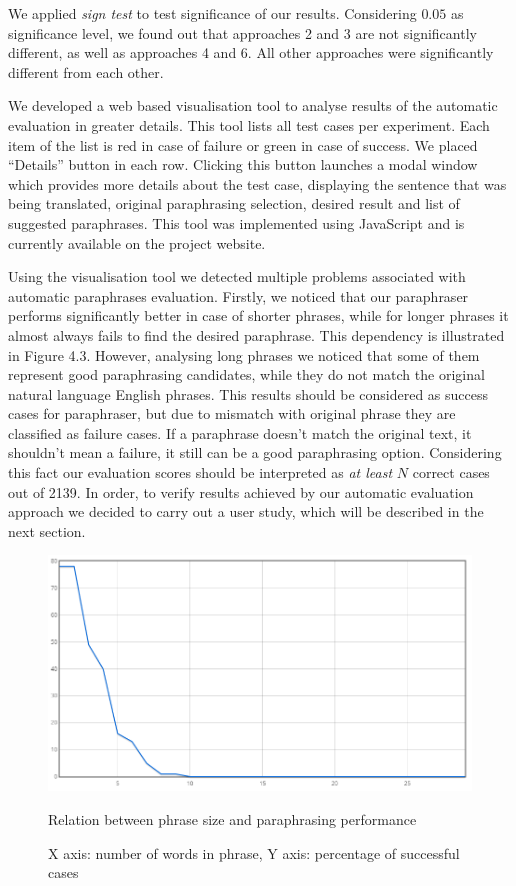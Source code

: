 We applied \emph{sign test} to test significance of our results. Considering $0.05$ as significance level, we found out that approaches 2 and 3 are not significantly different, as well as approaches 4 and 6. All other approaches were significantly different from each other. 

We developed a web based visualisation tool to analyse results of the automatic evaluation in greater details. This tool lists all test cases per experiment. Each item of the list is red in case of failure or green in case of success. We placed ``Details'' button in each row. Clicking this button launches a modal window which provides more details about the test case, displaying the sentence that was being translated, original paraphrasing selection, desired result and list of suggested paraphrases. This tool was implemented using JavaScript and is currently available on the project website. 

Using the visualisation tool we detected multiple problems associated with automatic paraphrases evaluation. Firstly, we noticed that our paraphraser performs significantly better in case of shorter phrases, while for longer phrases it almost always fails to find the desired paraphrase. This dependency is illustrated in Figure 4.3. However, analysing long phrases we noticed that some of them represent good paraphrasing candidates, while they do not match the original natural language English phrases. This results should be considered as success cases for paraphraser, but due to mismatch with original phrase they are classified as failure cases. If a paraphrase doesn't match the original text, it shouldn't mean a failure, it still can be a good paraphrasing option. Considering this fact our evaluation scores should be interpreted as \emph{at least} $N$ correct cases out of 2139. In order, to verify results achieved by our automatic evaluation approach we decided to carry out a user study, which will be described in the next section.

\begin{figure}
 \centering 
 \includegraphics[scale=0.6]{g/phrase-size-chart.png}
 \caption{Relation between phrase size and paraphrasing performance}
 \caption*{X axis: number of words in phrase, Y axis: percentage of successful cases}
\end{figure}


